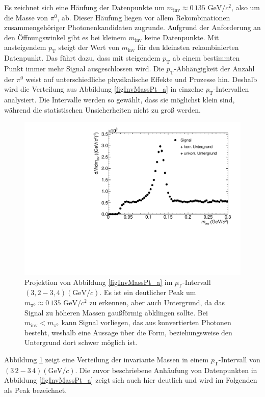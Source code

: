 Es zeichnet sich eine Häufung der Datenpunkte um $m_{\text{inv}}\approx 0\,135\text{ GeV}/c^{2}$, also um die Masse von $\pi^{0}$, ab.
Dieser Häufung liegen vor allem Rekombinationen zusammengehöriger Photonenkandidaten zugrunde.
Aufgrund der Anforderung an den Öffnungswinkel gibt es bei kleinem $m_{\text{inv}}$ keine Datenpunkte.
Mit ansteigendem $p_{\text{T}}$ steigt der Wert von $m_{\text{inv}}$ für den kleinsten rekombinierten Datenpunkt.
Das führt dazu, dass mit steigendem $p_{\text{T}}$ ab einem bestimmten Punkt immer mehr Signal ausgeschlossen wird.
\newline
Die $p_{\text{T}}$-Abhängigkeit der Anzahl der $\pi^{0}$ weist auf unterschiedliche physikalische Effekte und Prozesse hin.
Deshalb wird die Verteilung aus Abbildung \ref{figInvMassPt_a} in einzelne $p_{\text{T}}$-Intervallen analysiert.
Die Intervalle werden so gewählt, dass sie möglichst klein sind, während die statistischen Unsicherheiten nicht zu groß werden.
\begin{figure}[tbp]
\centering
\includegraphics[width=.75\linewidth]{hSignalPlusBkg.pdf}
\caption{Projektion von Abbildung \ref{figInvMassPt_a} im $p_{\text{T}}$-Intervall $(3,2 - 3,4) (\text{GeV/}c)$. Es ist ein deutlicher Peak um $m_{\pi^{0}} \approx 0\,135\text{ GeV/}c^{2}$ zu erkennen, aber auch Untergrund, da das Signal zu höheren Massen gaußförmig abklingen sollte. Bei $m_{\text{inv}} < m_{\pi^{0}}$ kann Signal vorliegen, das aus konvertierten Photonen besteht, weshalb eine Aussage über die Form, beziehungsweise den Untergrund dort schwer möglich ist.}
\label{figSignalPlusBkg}
\end{figure}
\newline
Abbildung \ref{figSignalPlusBkg} zeigt eine Verteilung der invariante Massen in einem $p_{\text{T}}$-Intervall von $(3\,2 - 3\,4)(\text{GeV}/c)$.
Die zuvor beschriebene Anhäufung von Datenpunkten in Abbildung \ref{figInvMassPt_a} zeigt sich auch hier deutlich und wird im Folgenden als Peak bezeichnet.
